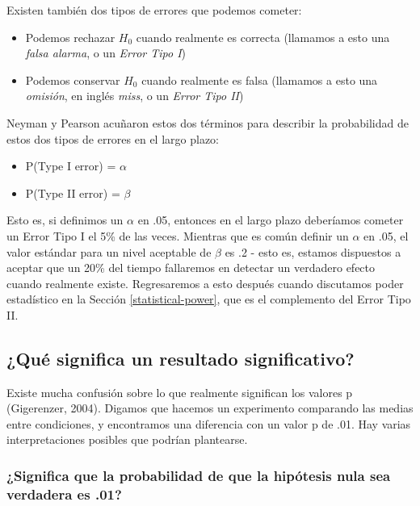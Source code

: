 \documentclass[
  12pt,
]{book}
\providecommand{\tightlist}{%
  \setlength{\itemsep}{0pt}\setlength{\parskip}{0pt}}
\begin{document}
Existen también dos tipos de errores que podemos cometer:

\begin{itemize}
\tightlist
\item
  Podemos rechazar \(H_0\) cuando realmente es correcta (llamamos a esto una \emph{falsa alarma}, o un \emph{Error Tipo I})
\item
  Podemos conservar \(H_0\) cuando realmente es falsa (llamamos a esto una \emph{omisión}, en inglés \emph{miss}, o un \emph{Error Tipo II})
\end{itemize}

Neyman y Pearson acuñaron estos dos términos para describir la probabilidad de estos dos tipos de errores en el largo plazo:

\begin{itemize}
\tightlist
\item
  P(Type I error) = \(\alpha\)
\item
  P(Type II error) = \(\beta\)
\end{itemize}

Esto es, si definimos un \(\alpha\) en .05, entonces en el largo plazo deberíamos cometer un Error Tipo I el 5\% de las veces. Mientras que es común definir un \(\alpha\) en .05, el valor estándar para un nivel aceptable de \(\beta\) es .2 - esto es, estamos dispuestos a aceptar que un 20\% del tiempo fallaremos en detectar un verdadero efecto cuando realmente existe. Regresaremos a esto después cuando discutamos poder estadístico en la Sección \ref{statistical-power}, que es el complemento del Error Tipo II.

\hypertarget{quuxe9-significa-un-resultado-significativo}{%
\subsection{¿Qué significa un resultado significativo?}\label{quuxe9-significa-un-resultado-significativo}}

Existe mucha confusión sobre lo que realmente significan los valores p (Gigerenzer, 2004). Digamos que hacemos un experimento comparando las medias entre condiciones, y encontramos una diferencia con un valor p de .01. Hay varias interpretaciones posibles que podrían plantearse.

\hypertarget{significa-que-la-probabilidad-de-que-la-hipuxf3tesis-nula-sea-verdadera-es-.01}{%
\subsubsection{¿Significa que la probabilidad de que la hipótesis nula sea verdadera es .01?}\label{significa-que-la-probabilidad-de-que-la-hipuxf3tesis-nula-sea-verdadera-es-.01}}
\end{document}

